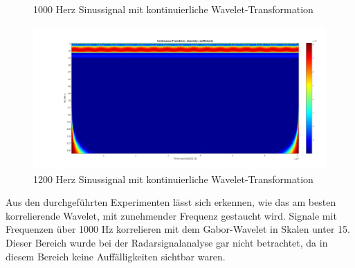 \begin{refsection}
\begin{figure}[h]
	\caption{1000 Herz Sinussignal mit kontinuierliche Wavelet-Transformation}
	\includegraphics[width=0.9\linewidth]{papers/meteor/images/anomalie/beam/cwt_1200hz.png}
	\caption{1200 Herz Sinussignal mit kontinuierliche Wavelet-Transformation}
	\label{fig:cwt_anomalie_beam_2}
\end{figure}
Aus den durchgeführten Experimenten lässt sich erkennen, wie das am besten korrelierende Wavelet, mit zunehmender Frequenz gestaucht wird. 
Signale mit Frequenzen über 1000 Hz korrelieren mit dem Gabor-Wavelet in Skalen unter 15.
Dieser Bereich wurde bei der Radarsignalanalyse gar nicht betrachtet, da in diesem Bereich keine Auffälligkeiten sichtbar waren. 


\end{refsection}

